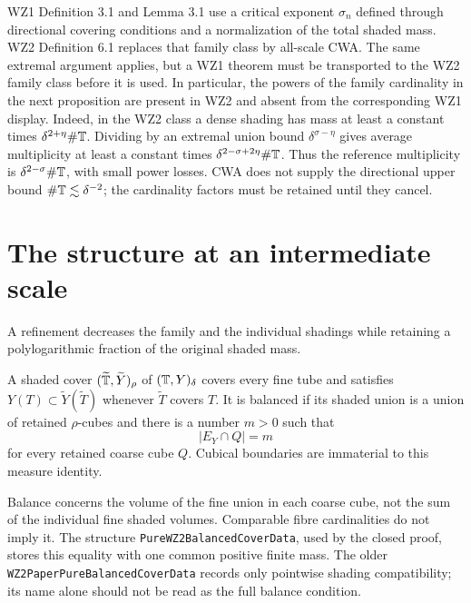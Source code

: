 \begin{remark}
\label{rem:wz1-extremality}
WZ1 Definition 3.1 and Lemma 3.1 use a critical exponent $\sigma_n$
defined through directional covering conditions and a normalization of
the total shaded mass. WZ2 Definition 6.1 replaces that family class by
all-scale CWA. The same extremal argument applies, but a WZ1 theorem
must be transported to the WZ2 family class before it is used. In
particular, the powers of the family cardinality in the next proposition
are present in WZ2 and absent from the corresponding WZ1 display.
Indeed, in the WZ2 class a dense shading has mass at least a constant
times $\delta^{2+\eta}\#\mathbb{T}$. Dividing by an extremal union bound
$\delta^{\sigma-\eta}$ gives average multiplicity at least a constant
times $\delta^{2-\sigma+2\eta}\#\mathbb{T}$. Thus the reference multiplicity
is $\delta^{2-\sigma}\#\mathbb{T}$, with small power losses. CWA does not
supply the directional upper bound $\#\mathbb{T}\lesssim\delta^{-2}$;
the cardinality factors must be retained until they cancel.
\end{remark}

\section{The structure at an intermediate scale}

A refinement decreases the family and the individual shadings while
retaining a polylogarithmic fraction of the original shaded mass.

\begin{definition}
\label{def:balanced-cover}
\leanok
{}
A shaded cover $(\widetilde{\mathbb{T}},\widetilde Y)_\rho$ of
$(\mathbb{T},Y)_\delta$ covers every fine tube and satisfies
$Y(T)\subset\widetilde Y(\widetilde T)$ whenever $\widetilde T$
covers $T$. It is balanced if its shaded union is a union of
retained $\rho$-cubes and there is a number $m>0$ such that
\[
             |E_Y\cap Q|=m
\]
for every retained coarse cube $Q$. Cubical boundaries are immaterial
to this measure identity.
\end{definition}

\begin{remark}
\label{rem:balanced-cover}
Balance concerns the volume of the fine union in each coarse cube,
not the sum of the individual fine shaded volumes. Comparable fibre
cardinalities do not imply it. The structure
\texttt{PureWZ2BalancedCoverData}, used by the closed proof, stores
this equality with one common positive finite mass. The older
\texttt{WZ2PaperPureBalancedCoverData} records only pointwise shading
compatibility; its name alone should not be read as the full balance
condition.
\end{remark}

